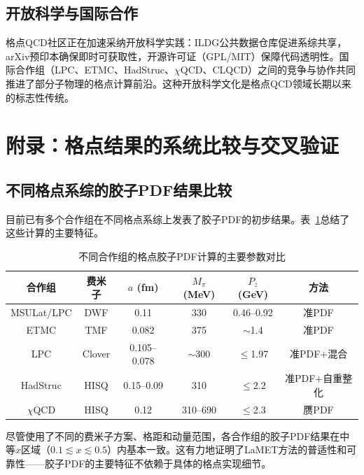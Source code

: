 \documentclass[11pt,a4paper]{ctexart}
\begin{document}
\subsection{开放科学与国际合作}

格点QCD社区正在加速采纳开放科学实践：ILDG公共数据仓库促进系综共享，arXiv预印本确保即时可获取性，开源许可证（GPL/MIT）保障代码透明性。国际合作组（LPC、ETMC、HadStruc、$\chi$QCD、CLQCD）之间的竞争与协作共同推进了部分子物理的格点计算前沿。这种开放科学文化是格点QCD领域长期以来的标志性传统。


\section{附录：格点结果的系统比较与交叉验证}

\subsection{不同格点系综的胶子PDF结果比较}

目前已有多个合作组在不同格点系综上发表了胶子PDF的初步结果。表~\ref{tab:ensemble_comparison}总结了这些计算的主要特征。

\begin{table}[htbp]
\centering
\caption{不同合作组的格点胶子PDF计算的主要参数对比}
\begin{tabular}{c c c c c c}
\toprule
\textbf{合作组} & \textbf{费米子} & \textbf{$a$ (fm)} & \textbf{$M_\pi$ (MeV)} & \textbf{$P_z$ (GeV)} & \textbf{方法} \\
\midrule
MSULat/LPC & DWF & 0.11 & 330 & 0.46--0.92 & 准PDF \\
ETMC & TMF & 0.082 & 375 & $\sim$1.4 & 准PDF \\
LPC & Clover & 0.105--0.078 & $\sim$300 & $\le$1.97 & 准PDF+混合 \\
HadStruc & HISQ & 0.15--0.09 & 310 & $\le$2.2 & 准PDF+自重整化 \\
$\chi$QCD & HISQ & 0.12 & 310--690 & $\le$2.3 & 赝PDF \\
\bottomrule
\end{tabular}
\label{tab:ensemble_comparison}
\end{table}

尽管使用了不同的费米子方案、格距和动量范围，各合作组的胶子PDF结果在中等$x$区域（$0.1 \lesssim x \lesssim 0.5$）内基本一致。这有力地证明了LaMET方法的普适性和可靠性——胶子PDF的主要特征不依赖于具体的格点实现细节。
\end{document}
